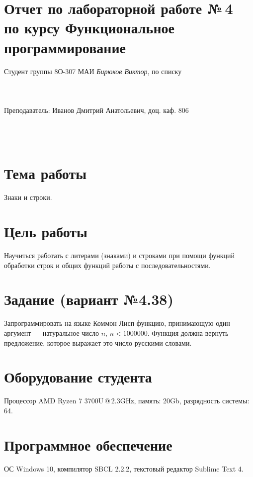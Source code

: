 \documentclass[12pt]{article}
\begin{document}
\section*{Отчет по лабораторной работе №\,4 \\
по курсу \guillemotleft  Функциональное программирование\guillemotright}
\begin{flushright}
Студент группы 8О-307 МАИ \textit{Бирюков Виктор},  по списку \\
 \\
 \\
\ \\
Преподаватель: Иванов Дмитрий Анатольевич, доц. каф. 806 \\
 \\
 \\
 \\

\end{flushright}

\section{Тема работы}
Знаки и строки.

\section{Цель работы}
Научиться работать с литерами (знаками) и строками при помощи функций обработки строк и общих функций работы с последовательностями.

\section{Задание (вариант №4.38)}
Запрограммировать на языке Коммон Лисп функцию, принимающую один аргумент --- натуральное число $n$, $n < 1000000$.
Функция должна вернуть предложение, которое выражает это число русскими словами.

\section{Оборудование студента}
Процессор AMD Ryzen 7 3700U\,@\,2.3GHz, память: 20Gb, разрядность системы: 64.

\section{Программное обеспечение}
ОС Windows 10, компилятор SBCL 2.2.2, текстовый редактор Sublime Text 4.
\end{document}

